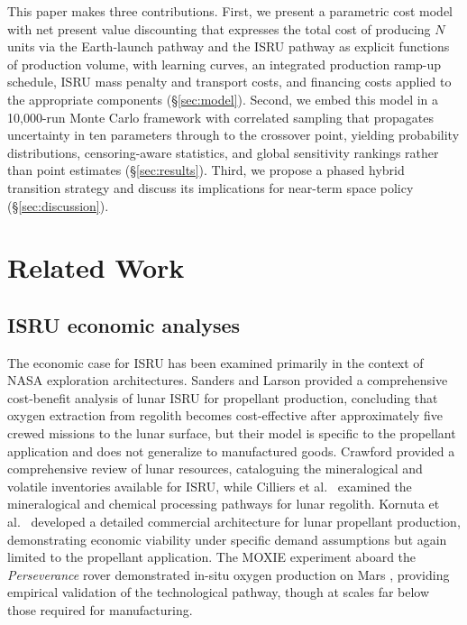 \documentclass[preprint,12pt]{elsarticle}
\begin{document}
This paper makes three contributions. First, we present a parametric cost model with net present value discounting that expresses the total cost of producing $N$ units via the Earth-launch pathway and the ISRU pathway as explicit functions of production volume, with learning curves, an integrated production ramp-up schedule, ISRU mass penalty and transport costs, and financing costs applied to the appropriate components (\S\ref{sec:model}). Second, we embed this model in a 10{,}000-run Monte Carlo framework with correlated sampling that propagates uncertainty in ten parameters through to the crossover point, yielding probability distributions, censoring-aware statistics, and global sensitivity rankings rather than point estimates (\S\ref{sec:results}). Third, we propose a phased hybrid transition strategy and discuss its implications for near-term space policy (\S\ref{sec:discussion}).

\section{Related Work}
\label{sec:related}

\subsection{ISRU economic analyses}

The economic case for ISRU has been examined primarily in the context of NASA exploration architectures. Sanders and Larson \cite{sanders2015} provided a comprehensive cost-benefit analysis of lunar ISRU for propellant production, concluding that oxygen extraction from regolith becomes cost-effective after approximately five crewed missions to the lunar surface, but their model is specific to the propellant application and does not generalize to manufactured goods. Crawford \cite{crawford2015} provided a comprehensive review of lunar resources, cataloguing the mineralogical and volatile inventories available for ISRU, while Cilliers et al.\ \cite{cilliers2023} examined the mineralogical and chemical processing pathways for lunar regolith. Kornuta et al.\ \cite{kornuta2019} developed a detailed commercial architecture for lunar propellant production, demonstrating economic viability under specific demand assumptions but again limited to the propellant application. The MOXIE experiment aboard the \textit{Perseverance} rover demonstrated in-situ oxygen production on Mars \cite{hecht2021}, providing empirical validation of the technological pathway, though at scales far below those required for manufacturing.
\end{document}
